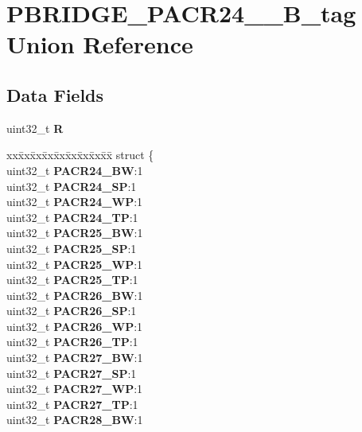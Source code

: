 \hypertarget{unionPBRIDGE__PACR24__31__32B__tag}{}\section{P\+B\+R\+I\+D\+G\+E\+\_\+\+P\+A\+C\+R24\+\_\+\_\+B\+\_\+tag Union Reference}
\label{unionPBRIDGE__PACR24__31__32B__tag}
\subsection*{Data Fields}
\begin{DoxyCompactItemize}
\item 
\mbox{\label{unionPBRIDGE__PACR24__31__32B__tag_ad372666992b2200d53db6595374eaed1}} 
uint32\+\_\+t {\bfseries R}
\item 
\mbox{\label{unionPBRIDGE__PACR24__31__32B__tag_aad9c94d0c9eff32e1994d6076a43d46e}} 
\begin{tabbing}
xx\=xx\=xx\=xx\=xx\=xx\=xx\=xx\=xx\=\kill
struct \{\\
\>uint32\_t {\bfseries PACR24\_BW}:1\\
\>uint32\_t {\bfseries PACR24\_SP}:1\\
\>uint32\_t {\bfseries PACR24\_WP}:1\\
\>uint32\_t {\bfseries PACR24\_TP}:1\\
\>uint32\_t {\bfseries PACR25\_BW}:1\\
\>uint32\_t {\bfseries PACR25\_SP}:1\\
\>uint32\_t {\bfseries PACR25\_WP}:1\\
\>uint32\_t {\bfseries PACR25\_TP}:1\\
\>uint32\_t {\bfseries PACR26\_BW}:1\\
\>uint32\_t {\bfseries PACR26\_SP}:1\\
\>uint32\_t {\bfseries PACR26\_WP}:1\\
\>uint32\_t {\bfseries PACR26\_TP}:1\\
\>uint32\_t {\bfseries PACR27\_BW}:1\\
\>uint32\_t {\bfseries PACR27\_SP}:1\\
\>uint32\_t {\bfseries PACR27\_WP}:1\\
\>uint32\_t {\bfseries PACR27\_TP}:1\\
\>uint32\_t {\bfseries PACR28\_BW}:1\\

\end{tabbing}
\end{DoxyCompactItemize}
